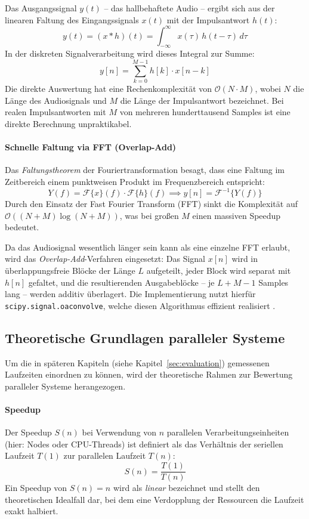 Das Ausgangssignal $y(t)$ -- das hallbehaftete Audio -- ergibt sich aus der linearen Faltung des Eingangssignals $x(t)$ mit der Impulsantwort $h(t)$:
\[y(t) = (x * h)(t) = \int_{-\infty}^{\infty} x(\tau)\, h(t - \tau)\, d\tau\]
In der diskreten Signalverarbeitung wird dieses Integral zur Summe:
\[y[n] = \sum_{k=0}^{M-1} h[k] \cdot x[n - k]\]
Die direkte Auswertung hat eine Rechenkomplexität von $\mathcal{O}(N \cdot M)$, wobei $N$ die Länge des Audiosignals und $M$ die Länge der Impulsantwort bezeichnet. Bei realen Impulsantworten mit $M$ von mehreren hunderttausend Samples ist eine direkte Berechnung unpraktikabel.

\paragraph{Schnelle Faltung via FFT (Overlap-Add)}

Das \emph{Faltungstheorem} der Fouriertransformation besagt, dass eine Faltung im Zeitbereich einem punktweisen Produkt im Frequenzbereich entspricht:
\[Y(f) = \mathcal{F}\{x\}(f) \cdot \mathcal{F}\{h\}(f) \implies y[n] = \mathcal{F}^{-1}\{Y(f)\}\]
Durch den Einsatz der Fast Fourier Transform (FFT) sinkt die Komplexität auf $\mathcal{O}((N+M)\log(N+M))$, was bei großen $M$ einen massiven Speedup bedeutet.

Da das Audiosignal wesentlich länger sein kann als eine einzelne FFT erlaubt, wird das \emph{Overlap-Add}-Verfahren eingesetzt: Das Signal $x[n]$ wird in überlappungsfreie Blöcke der Länge $L$ aufgeteilt, jeder Block wird separat mit $h[n]$ gefaltet, und die resultierenden Ausgabeblöcke -- je $L + M - 1$ Samples lang -- werden additiv überlagert. Die Implementierung nutzt hierfür \texttt{scipy.signal.oaconvolve}, welche diesen Algorithmus effizient realisiert \parencite{oppenheim2010,virtanen2020}.


\subsection{Theoretische Grundlagen paralleler Systeme}
\label{subsec:amdahl}

Um die in späteren Kapiteln (siehe Kapitel~\ref{sec:evaluation}) gemessenen Laufzeiten einordnen zu können, wird der theoretische Rahmen zur Bewertung paralleler Systeme herangezogen.

\paragraph{Speedup}
Der Speedup $S(n)$ bei Verwendung von $n$ parallelen Verarbeitungseinheiten (hier: Nodes oder CPU-Threads) ist definiert als das Verhältnis der seriellen Laufzeit $T(1)$ zur parallelen Laufzeit $T(n)$:
\begin{equation}
    S(n) = \frac{T(1)}{T(n)}
    \label{eq:speedup}
\end{equation}
Ein Speedup von $S(n) = n$ wird als \emph{linear} bezeichnet und stellt den theoretischen Idealfall dar, bei dem eine Verdopplung der Ressourcen die Laufzeit exakt halbiert.

